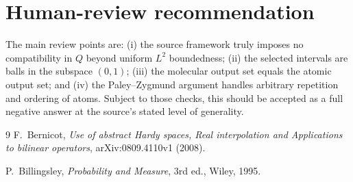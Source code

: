 \documentclass[11pt]{article}
\newcommand{\1}{\mathbf 1}
\begin{document}
\section{Human-review recommendation}

The main review points are: (i) the source framework truly imposes no compatibility in $Q$ beyond uniform $L^2$ boundedness; (ii) the selected intervals are balls in the subspace $(0,1)$; (iii) the molecular output set equals the atomic output set; and (iv) the Paley--Zygmund argument handles arbitrary repetition and ordering of atoms. Subject to those checks, this should be accepted as a full negative answer at the source's stated level of generality.

\begin{thebibliography}{9}
F.~Bernicot,
\emph{Use of abstract Hardy spaces, Real interpolation and Applications to bilinear operators},
arXiv:0809.4110v1 (2008).

P.~Billingsley,
\emph{Probability and Measure}, 3rd ed.,
Wiley, 1995.
\end{thebibliography}
\end{document}
